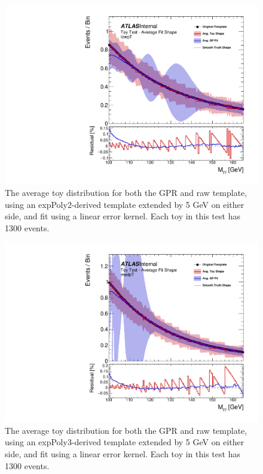 \begin{figure} 
\begin{center}
  \includegraphics[width=\textwidth]{figures/background/gpr/validation/linear/ToyTest_AvgFitShape_lowpT_1300_noSig}   
\caption{The average toy distribution for both the GPR and raw template, using an expPoly2-derived template extended by 5 GeV on either side, and fit using a linear error kernel. Each toy in this test has 1300 events.}
\label{fig:linearkernel_lowpt_1300_noSig}
\end{center}
\end{figure}

\begin{figure} 
\begin{center}
  \includegraphics[width=\textwidth]{figures/background/gpr/validation/linear/ToyTest_AvgFitShape_medpT_1300_noSig}   
\caption{The average toy distribution for both the GPR and raw template, using an expPoly3-derived template extended by 5 GeV on either side, and fit using a linear error kernel. Each toy in this test has 1300 events.}
\label{fig:linearkernel_medpt_1300_noSig}
\end{center}
\end{figure}

